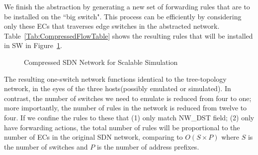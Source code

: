 We finish the abstraction by generating a new set of forwarding rules that are to be
installed on the ``big switch".
This process can be efficiently by considering only these ECs that
traverses edge switches in the abstracted network.
Table~\ref{Tab:CompressedFlowTable} shows the resulting rules that will be installed in
SW in Figure~\ref{Fig:ExampleBigSwitch}.

\begin{figure}[t]
\centering
{}
\caption{Compressed SDN Network for Scalable Simulation}
\label{Fig:ExampleBigSwitch}
\end{figure}

The resulting one-switch network functions identical to the tree-topology network,
in the eyes of the three hosts(possibly emulated or simulated).
In contrast, the number of switches we need to emulate is reduced from four to one;
more importantly, the number of rules in the network is reduced from twelve to four.
If we confine the rules to these that (1) only match NW\_DST field;
(2) only have forwarding actions,
the total number of rules will be proportional to the number of ECs in the
original SDN network, comparing to $O(S\times P)$ where $S$ is the number of switches
and $P$ is the number of address prefixes.


